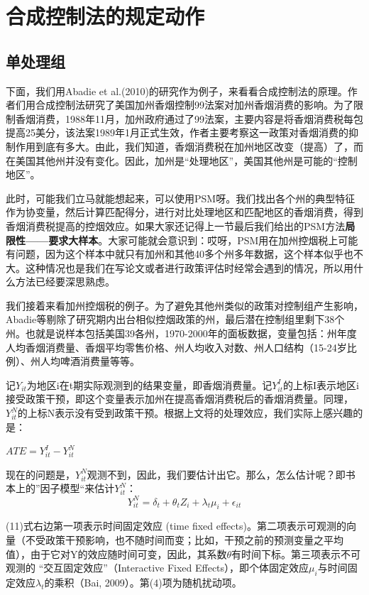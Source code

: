 \documentclass[cn,12pt,math=newtx,citestyle=gb7714-2015,bibstyle=gb7714-2015]{elegantbook}
\begin{document}
    \section{合成控制法的规定动作}
    \subsection{单处理组}
	
	下面，我们用Abadie et al.(2010)的研究作为例子，来看看合成控制法的原理。作者们用合成控制法研究了美国加州香烟控制99法案对加州香烟消费的影响。为了限制香烟消费，1988年11月，加州政府通过了99法案，主要内容是将香烟消费税每包提高25美分，该法案1989年1月正式生效，作者主要考察这一政策对香烟消费的抑制作用到底有多大。由此，我们知道，香烟消费税在加州地区改变（提高）了，而在美国其他州并没有变化。因此，加州是“处理地区”，美国其他州是可能的“控制地区”。
	
	此时，可能我们立马就能想起来，可以使用PSM呀。我们找出各个州的典型特征作为协变量，然后计算匹配得分，进行对比处理地区和匹配地区的香烟消费，得到香烟消费税提高的控烟效应。如果大家还记得上一节最后我们给出的PSM方法\textbf{局限性——要求大样本}。大家可能就会意识到：哎呀，PSM用在加州控烟税上可能有问题，因为这个样本中就只有加州和其他40多个州多年数据，这个样本似乎也不大。这种情况也是我们在写论文或者进行政策评估时经常会遇到的情况，所以用什么方法已经要深思熟虑。
	
	我们接着来看加州控烟税的例子。为了避免其他州类似的政策对控制组产生影响，Abadie等剔除了研究期内出台相似控烟政策的州，最后潜在控制组里剩下38个州。也就是说样本包括美国39各州，1970-2000年的面板数据，变量包括：州年度人均香烟消费量、香烟平均零售价格、州人均收入对数、州人口结构（15-24岁比例）、州人均啤酒消费量等等。
	
	记$Y_{it}$为地区i在t期实际观测到的结果变量，即香烟消费量。记$Y_{it}^I$的上标I表示地区i接受政策干预，即这个变量表示加州在提高香烟消费税后的香烟消费量。同理，$Y_{it}^N$的上标N表示没有受到政策干预。根据上文将的处理效应，我们实际上感兴趣的是：
	\begin{center}
		$ATE=Y_{it}^I-Y_{it}^N$
	\end{center}
	
	现在的问题是，$Y_{it}^N$观测不到，因此，我们要估计出它。那么，怎么估计呢？即书本上的”因子模型“来估计$Y_{it}^N$：
	\begin{equation}
		Y_{it}^N=\delta_t+\theta_tZ_i+\lambda_t\mu_i+\epsilon_{it}
	\end{equation}
	
	(11)式右边第一项表示时间固定效应 (time fixed effects)。第二项表示可观测的向量（不受政策干预影响，也不随时间而变；比如，干预之前的预测变量之平均值），由于它对Y的效应随时间可变，因此，其系数$\theta$有时间下标。第三项表示不可观测的 “交互固定效应”（Interactive Fixed Effects），即个体固定效应$\mu_i$与时间固定效应$\lambda_t$的乘积（Bai, 2009）。第(4)项为随机扰动项。
	
\end{document}
